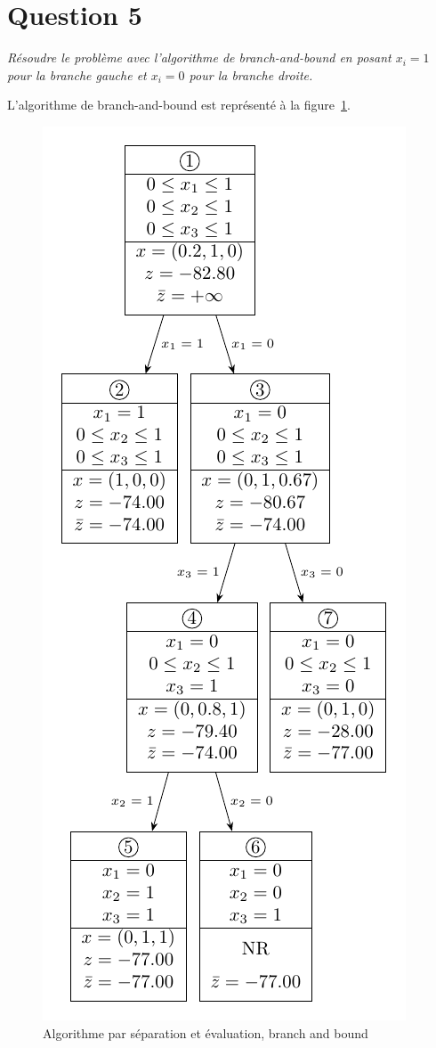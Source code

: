 \section*{Question 5}

\emph{Résoudre le problème avec l’algorithme de branch-and-bound en posant $x_i = 1$ pour la branche gauche et $x_i = 0$ pour la branche droite.}

L’algorithme de branch-and-bound est représenté à la figure~\ref{arbre5}.

\begin{figure}[htb]
	\caption{Algorithme par séparation et évaluation, branch and bound}
	\label{arbre5}
	\centering
	\includegraphics[height=.98\textheight]{question/forest/5.pdf}
\end{figure}

